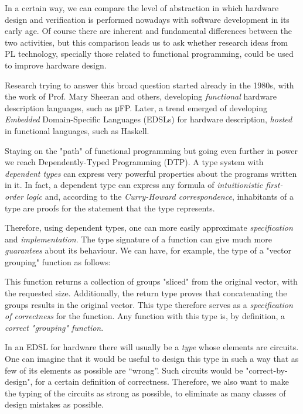 \documentclass[a4paper,draft]{report}
\begin{document}
        In a certain way, we can compare the level of abstraction in which hardware design and verification
        is performed nowadays with software development in its early age.
        Of course there are inherent and fundamental differences between the two activities, but
        this comparison leads us to ask whether research ideas from PL technology,
        specially those related to functional programming, could be used to improve hardware design.

        Research trying to answer this broad question started already in the 1980s,
        with the work of Prof. Mary Sheeran and others,
        developing \emph{functional} hardware description languages, such as μFP.
        Later, a trend emerged of developing \emph{Embedded} Domain-Specific Languages (EDSLs)
        for hardware description, \emph{hosted} in functional languages, such as Haskell.

        Staying on the "path" of functional programming but going even further in power we reach
        Dependently-Typed Programming (DTP).
        A type system with \emph{dependent types} can express very powerful properties
        about the programs written in it.
        In fact, a dependent type can express any formula of \emph{intuitionistic first-order logic} and,
        according to the \emph{Curry-Howard correspondence},
        inhabitants of a type are proofs for the statement that the type represents.

        Therefore, using dependent types, one can more easily approximate \emph{specification} and \emph{implementation}.
        The type signature of a function can give much more \emph{guarantees} about its behaviour.
        We can have, for example, the type of a "vector grouping" function as follows:


        This function returns a collection of groups "sliced" from the original vector, with the requested size.
        Additionally, the return type proves that concatenating the groups results in the original vector.
        This type therefore serves as a \emph{specification of correctness} for the function.
        Any function with this type is, by definition, a \emph{correct "grouping" function}.

        In an EDSL for hardware there will usually be a \emph{type} whose elements are circuits.
        One can imagine that it would be useful to design this type in such a way that as few of its elements as possible are ``wrong''.
        Such circuits would be "correct-by-design", for a certain definition of correctness.
        Therefore, we also want to make the typing of the circuits as strong as possible,
        to eliminate as many classes of design mistakes as possible.
\end{document}
